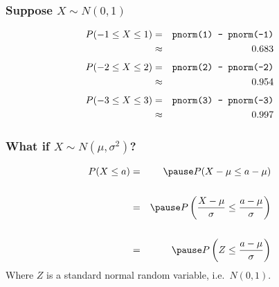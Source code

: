 \documentclass[handout]{beamer}
\begin{document}
\begin{frame}
\frametitle{Suppose $X \sim N(0,1)$}
\begin{eqnarray*}
	P(-1 \leq X \leq 1) &=& \mbox{\texttt{pnorm(1) - pnorm(-1)}}\\
		&\approx& 0.683
\end{eqnarray*}
\begin{eqnarray*}
	P(-2 \leq X \leq 2) &=& \mbox{\texttt{pnorm(2) - pnorm(-2)}}\\
		&\approx& 0.954
\end{eqnarray*}
\begin{eqnarray*}
	P(-3 \leq X \leq 3) &=& \mbox{\texttt{pnorm(3) - pnorm(-3)}}\\
		&\approx& 0.997
\end{eqnarray*}

\end{frame}
\begin{frame}
\frametitle{What if $X \sim N(\mu, \sigma^2)$?}
\begin{eqnarray*}
	P(X \leq a) &=& \pause P(X - \mu \leq a - \mu)\\\\
		&=& \pause P\left( \frac{X-\mu}{\sigma} \leq \frac{a - \mu}{\sigma} \right)\\\\
		&=&\pause  P\left(Z \leq  \frac{a - \mu}{\sigma}\right)
\end{eqnarray*}
Where $Z$ is a standard normal random variable, i.e.\ $N(0,1)$.
\end{frame}
\end{document}

